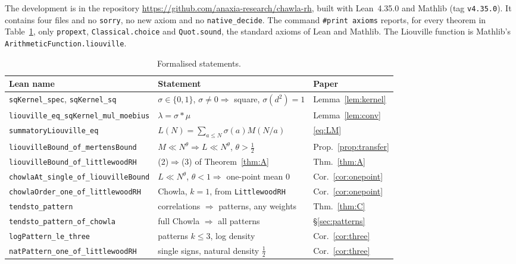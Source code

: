 \documentclass[11pt]{amsart}
\numberwithin{equation}{section}
\theoremstyle{plain}
\theoremstyle{definition}
\theoremstyle{remark}
\newcommand{\lean}[1]{\texttt{#1}}
\begin{document}
The development is in the repository \url{https://github.com/anaxia-research/chawla-rh}, built with Lean~4.35.0 and Mathlib (tag \texttt{v4.35.0}). It contains four files and no \texttt{sorry}, no new axiom and no \texttt{native\_decide}. The command \texttt{\#print axioms} reports, for every theorem in Table~\ref{tab:lean}, only \texttt{propext}, \texttt{Classical.choice} and \texttt{Quot.sound}, the standard axioms of Lean and Mathlib. The Liouville function is Mathlib's \texttt{ArithmeticFunction.liouville}.

\begin{table}[h]
\centering\small
\begin{tabular}{@{}lll@{}}
\toprule
Lean name & Statement & Paper\\
\midrule
\lean{sqKernel\_spec}, \lean{sqKernel\_sq} & $\sigma\in\{0,1\}$, $\sigma\ne0\Rightarrow$ square, $\sigma(d^2)=1$ & Lemma~\ref{lem:kernel}\\
\lean{liouville\_eq\_sqKernel\_mul\_moebius} & $\lambda=\sigma*\mu$ & Lemma~\ref{lem:conv}\\
\lean{summatoryLiouville\_eq} & $L(N)=\sum_{a\le N}\sigma(a)M(N/a)$ & \eqref{eq:LM}\\
\lean{liouvilleBound\_of\_mertensBound} & $M\ll N^\theta\Rightarrow L\ll N^\theta$, $\theta>\frac12$ & Prop.~\ref{prop:transfer}\\
\lean{liouvilleBound\_of\_littlewoodRH} & (2)$\Rightarrow$(3) of Theorem~\ref{thm:A} & Thm.~\ref{thm:A}\\
\lean{chowlaAt\_single\_of\_liouvilleBound} & $L\ll N^\theta$, $\theta<1\Rightarrow$ one-point mean $0$ & Cor.~\ref{cor:onepoint}\\
\lean{chowlaOrder\_one\_of\_littlewoodRH} & Chowla, $k=1$, from \lean{LittlewoodRH} & Cor.~\ref{cor:onepoint}\\
\lean{tendsto\_pattern} & correlations $\Rightarrow$ patterns, any weights & Thm.~\ref{thm:C}\\
\lean{tendsto\_pattern\_of\_chowla} & full Chowla $\Rightarrow$ all patterns & \S\ref{sec:patterns}\\
\lean{logPattern\_le\_three} & patterns $k\le3$, log density & Cor.~\ref{cor:three}\\
\lean{natPattern\_one\_of\_littlewoodRH} & single signs, natural density $\frac12$ & Cor.~\ref{cor:three}\\
\bottomrule
\end{tabular}
\caption{Formalised statements.}
\label{tab:lean}
\end{table}
\end{document}
